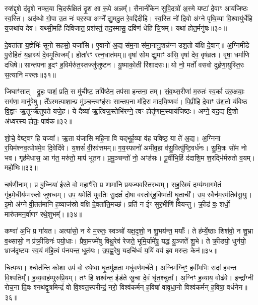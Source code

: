 रुश॑द्दृ॒शे द॑दृशे नक्त॒या चि॒दरू᳚क्षितं दृ॒श आ रू॒पे अन्नम्᳚। सैनानी॑केन सुवि॒दत्रो॑ अ॒स्मे यष्टा॑ दे॒वाꣳ आय॑जिष्ठः स्व॒स्ति। अद॑ब्धो गो॒पा उ॒त नः॑ पर॒स्पा अग्ने᳚ द्यु॒मदु॒त रे॒वद्दि॑दीहि। स्व॒स्ति नो॑ दि॒वो अ॑ग्ने पृथि॒व्या वि॒श्वायु॑र्धेहि य॒जथा॑य देव। यथ्सी॒महि॑ दिविजात॒ प्रश॑स्तं॒ तद॒स्मासु॒ द्रवि॑णं धेहि चि॒त्रम्। यथा॑ होत॒र्मनु॑षः॥३०॥

दे॒वता॑ता य॒ज्ञेभिः॑ सूनो सहसो॒ यजा॑सि। ए॒वानो॑ अ॒द्य स॑म॒ना स॑मा॒नानु॒शन्न॑ग्न उश॒तो य॑क्षि दे॒वान्॥ अ॒ग्निमी॑डे पु॒रोहि॑तं य॒ज्ञस्य॑ दे॒वमृ॒त्विजम्᳚। होता॑रꣳ रत्न॒धात॑मम्॥ वृषा॑ सोम द्यु॒माꣳ अ॑सि॒ वृषा॑ देव॒ वृष॑व्रतः। वृषा॒ धर्मा॑णि दधिषे॥ सान्त॑पना इ॒दꣳ ह॒विर्मरु॑त॒स्तज्जु॑जुष्टन। यु॒ष्माको॒ती रि॑शादसः॥ यो नो॒ मर्तो॑ वसवो दुर्\mbox{}हृणा॒युस्ति॒रः स॒त्यानि॑ मरुतः॥३१॥

जिघाꣳ॑सात्। द्रु॒हः पाशं॒ प्रति॒ स मु॑चीष्ट॒ तपि॑ष्ठेन॒ तप॑सा हन्तना॒ तम्। सं॒व॒थ्स॒रीणा॑ म॒रुतः॑ स्व॒र्का उ॑रु॒क्षयाः॒ सग॑णा॒ मानु॑षेषु। ते᳚\-ऽस्मत्पाशा॒न्प्र मु॑ञ्च॒न्त्वꣳह॑सः सान्तप॒ना म॑दि॒रा मा॑दयि॒ष्णवः॑। पि॒प्री॒हि दे॒वाꣳ उ॑श॒तो य॑विष्ठ वि॒द्वाꣳ ऋ॒तूꣳर्\mbox{}ऋ॑तुपते यजे॒ह। ये दैव्या॑ ऋ॒त्विज॒स्तेभि॑रग्ने॒ त्वꣳ होतॄ॑णाम॒स्याय॑जिष्ठः। अग्ने॒ यद॒द्य वि॒शो अ॑ध्वरस्य होतः॒ पाव॑क॥३२॥

शो॒चे॒ वेष्ट्वꣳ हि यज्वा᳚। ऋ॒ता य॑जासि महि॒ना वि यद्भूर्\mbox{}ह॒व्या व॑ह यविष्ठ॒ या ते॑ अ॒द्य। अ॒ग्निना॑ र॒यिम॑श्नव॒त्पोष॑मे॒व दि॒वेदि॑वे। य॒शसं॑ वी॒रव॑त्तमम्॥ ग॒य॒स्फानो॑ अमीव॒हा व॑सु॒वित्पु॑ष्टि॒वर्ध॑नः। सु॒मि॒त्रः सो॑म नो भव। गृह॑मेधास॒ आ ग॑त॒ मरु॑तो॒ माप॑ भूतन। प्र॒मु॒ञ्चन्तो॑ नो॒ अꣳह॑सः। पू॒र्वीभि॒र्\mbox{}हि द॑दाशि॒म श॒रद्भि॑र्मरुतो व॒यम्। महो॑भिः॥३३॥

च॒र्\mbox{}ष॒णी॒नाम्। प्र बु॒ध्निया॑ ईरते वो॒ महाꣳ॑सि॒ प्र णामा॑नि प्रयज्यवस्तिरध्वम्। स॒ह॒स्रियं॒ दम्य॑म्भा॒गमे॒तं गृ॑हमे॒धीय॑म्मरुतो जुषध्वम्। उप॒ यमेति॑ युव॒तिः सु॒दक्षं॑ दो॒षा वस्तोर्\mbox{}॑ह॒विष्म॑ती घृ॒ताची᳚। उप॒ स्वैन॑म॒रम॑तिर्वसू॒युः। इ॒मो अ॑ग्ने वी॒तत॑मानि ह॒व्याज॑स्रो वक्षि दे॒वता॑ति॒मच्छ॑। प्रति॑ न ईꣳ सुर॒भीणि॑ वियन्तु। क्री॒डं वः॒ शर्धो॒ मारु॑तमन॒र्वाणꣳ॑ रथे॒शुभम्᳚।॥३४॥

कण्वा॑ अ॒भि प्र गा॑यत। अत्या॑सो॒ न ये म॒रुतः॒ स्वञ्चो॑ यक्ष॒दृशो॒ न शु॒भय॑न्त॒ मर्याः᳚। ते ह॑र्म्ये॒ष्ठाः शिश॑वो॒ न शु॒भ्रा व॒थ्सासो॒ न प्र॑क्री॒डिनः॑ पयो॒धाः। प्रैषा॒मज्मे॑षु विथु॒रेव॑ रेजते॒ भूमि॒र्यामे॑षु॒ यद्ध॑ यु॒ञ्जते॑ शु॒भे। ते क्री॒डयो॒ धुन॑यो॒ भ्राज॑दृष्टयः स्व॒यं म॑हि॒त्वं प॑नयन्त॒ धूत॑यः। उ॒प॒ह्व॒रेषु॒ यदचि॑ध्वं य॒यिं वय॑ इव मरुतः॒ केन॑॥३५॥

चि॒त्प॒था। श्चोत॑न्ति॒ कोशा॒ उप॑ वो॒ रथे॒ष्वा घृ॒तमु॑क्षता॒ मधु॑वर्ण॒मर्च॑ते। अ॒ग्निम॑ग्नि॒ꣳ॒ हवी॑मभिः॒ सदा॑ हवन्त वि॒श्पतिम्᳚। ह॒व्य॒वाह॑म्पुरुप्रि॒यम्। तꣳ हि शश्व॑न्त॒ ईड॑ते स्रु॒चा दे॒वं घृ॑त॒श्चुता᳚। अ॒ग्निꣳ ह॒व्याय॒ वोढ॑वे। इन्द्रा᳚ग्नी रोच॒ना दि॒वः श्नथ॑द्वृ॒त्रमिन्द्रं॑ वो वि॒श्वत॒स्परीन्द्रं॒ नरो॒ विश्व॑कर्मन् ह॒विषा॑ वावृधा॒नो विश्व॑कर्मन् ह॒विषा॒ वर्ध॑नेन॥३६॥

